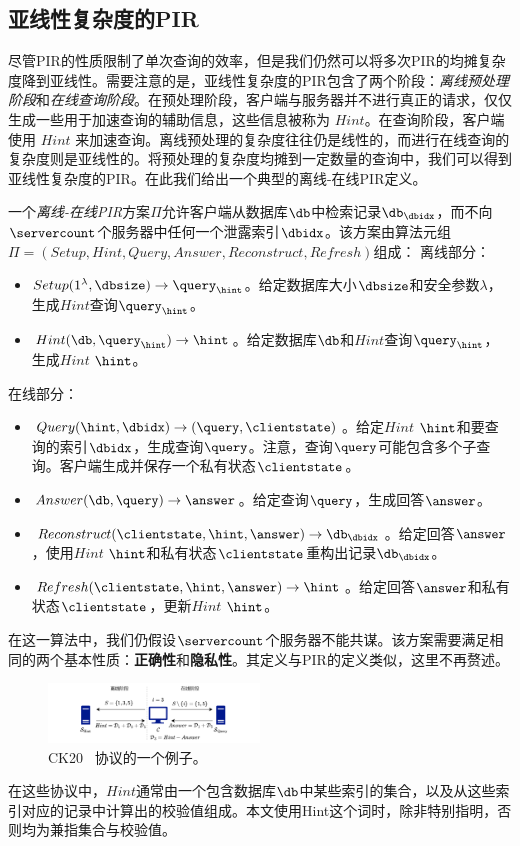 \subsection{亚线性复杂度的PIR}
尽管PIR的性质限制了单次查询的效率，但是我们仍然可以将多次PIR的均摊复杂度降到亚线性。需要注意的是，亚线性复杂度的PIR包含了两个阶段：\textit{离线预处理阶段}和\textit{在线查询阶段}。在预处理阶段，客户端与服务器并不进行真正的请求，仅仅生成一些用于加速查询的辅助信息，这些信息被称为 $Hint$。在查询阶段，客户端使用 $Hint$ 来加速查询。离线预处理的复杂度往往仍是线性的，而进行在线查询的复杂度则是亚线性的。将预处理的复杂度均摊到一定数量的查询中，我们可以得到亚线性复杂度的PIR。在此我们给出一个典型的离线-在线PIR定义。

\begin{definition}[离线-在线PIR]
    一个\textit{离线-在线PIR}方案$\Pi$允许客户端从数据库$\db$中检索记录$\db_\dbidx$，而不向$\servercount$个服务器中任何一个泄露索引$\dbidx$。该方案由算法元组$\Pi = (Setup, Hint, Query, Answer, Reconstruct, Refresh)$组成：
    离线部分：
    \begin{itemize}[leftmargin=*]
        \item $Setup(1^\lambda,\dbsize) \rightarrow \query_\hint$。给定数据库大小$\dbsize$和安全参数$\lambda$，生成$Hint$查询$\query_\hint$。
        \item $Hint(\db, \query_\hint) \rightarrow \hint$。给定数据库$\db$和$Hint$查询$\query_\hint$，生成$Hint$ $\hint$。
    \end{itemize}
    在线部分：
    \begin{itemize}[leftmargin=*]
        \item $Query(\hint, \dbidx) \rightarrow (\query, \clientstate)$。给定$Hint$ $\hint$和要查询的索引$\dbidx$，生成查询$\query$。注意，查询$\query$可能包含多个子查询。客户端生成并保存一个私有状态$\clientstate$。
        \item $Answer(\db, \query) \rightarrow \answer$。给定查询$\query$，生成回答$\answer$。
        \item $Reconstruct(\clientstate, \hint, \answer) \rightarrow \db_\dbidx$。给定回答$\answer$，使用$Hint$ $\hint$和私有状态$\clientstate$重构出记录$\db_\dbidx$。
        \item $Refresh(\clientstate, \hint, \answer) \rightarrow \hint$。给定回答$\answer$和私有状态$\clientstate$，更新$Hint$ $\hint$。
    \end{itemize}
    在这一算法中，我们仍假设$\servercount$个服务器不能共谋。该方案需要满足相同的两个基本性质：\textbf{正确性}和\textbf{隐私性}。其定义与PIR的定义类似，这里不再赘述。
\end{definition}

\begin{figure}
    \centering
    \includegraphics[width=0.5\textwidth]{figure/ck20.png}
    \caption{CK20~\cite{EC:CorKog20} 协议的一个例子。}
    \label{fig:CK20}
\end{figure}

在这些协议中，$Hint$通常由一个包含数据库$\db$中某些索引的集合，以及从这些索引对应的记录中计算出的校验值组成。本文使用Hint这个词时，除非特别指明，否则均为兼指集合与校验值。
